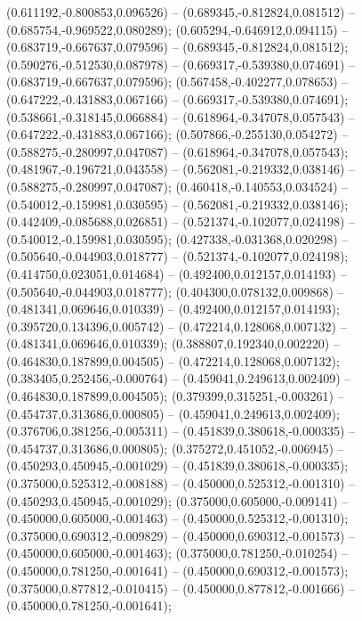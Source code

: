  (0.611192,-0.800853,0.096526) -- (0.689345,-0.812824,0.081512) -- (0.685754,-0.969522,0.080289);
 (0.605294,-0.646912,0.094115) -- (0.683719,-0.667637,0.079596) -- (0.689345,-0.812824,0.081512);
 (0.590276,-0.512530,0.087978) -- (0.669317,-0.539380,0.074691) -- (0.683719,-0.667637,0.079596);
 (0.567458,-0.402277,0.078653) -- (0.647222,-0.431883,0.067166) -- (0.669317,-0.539380,0.074691);
 (0.538661,-0.318145,0.066884) -- (0.618964,-0.347078,0.057543) -- (0.647222,-0.431883,0.067166);
 (0.507866,-0.255130,0.054272) -- (0.588275,-0.280997,0.047087) -- (0.618964,-0.347078,0.057543);
 (0.481967,-0.196721,0.043558) -- (0.562081,-0.219332,0.038146) -- (0.588275,-0.280997,0.047087);
 (0.460418,-0.140553,0.034524) -- (0.540012,-0.159981,0.030595) -- (0.562081,-0.219332,0.038146);
 (0.442409,-0.085688,0.026851) -- (0.521374,-0.102077,0.024198) -- (0.540012,-0.159981,0.030595);
 (0.427338,-0.031368,0.020298) -- (0.505640,-0.044903,0.018777) -- (0.521374,-0.102077,0.024198);
 (0.414750,0.023051,0.014684) -- (0.492400,0.012157,0.014193) -- (0.505640,-0.044903,0.018777);
 (0.404300,0.078132,0.009868) -- (0.481341,0.069646,0.010339) -- (0.492400,0.012157,0.014193);
 (0.395720,0.134396,0.005742) -- (0.472214,0.128068,0.007132) -- (0.481341,0.069646,0.010339);
 (0.388807,0.192340,0.002220) -- (0.464830,0.187899,0.004505) -- (0.472214,0.128068,0.007132);
 (0.383405,0.252456,-0.000764) -- (0.459041,0.249613,0.002409) -- (0.464830,0.187899,0.004505);
 (0.379399,0.315251,-0.003261) -- (0.454737,0.313686,0.000805) -- (0.459041,0.249613,0.002409);
 (0.376706,0.381256,-0.005311) -- (0.451839,0.380618,-0.000335) -- (0.454737,0.313686,0.000805);
 (0.375272,0.451052,-0.006945) -- (0.450293,0.450945,-0.001029) -- (0.451839,0.380618,-0.000335);
 (0.375000,0.525312,-0.008188) -- (0.450000,0.525312,-0.001310) -- (0.450293,0.450945,-0.001029);
 (0.375000,0.605000,-0.009141) -- (0.450000,0.605000,-0.001463) -- (0.450000,0.525312,-0.001310);
 (0.375000,0.690312,-0.009829) -- (0.450000,0.690312,-0.001573) -- (0.450000,0.605000,-0.001463);
 (0.375000,0.781250,-0.010254) -- (0.450000,0.781250,-0.001641) -- (0.450000,0.690312,-0.001573);
 (0.375000,0.877812,-0.010415) -- (0.450000,0.877812,-0.001666) -- (0.450000,0.781250,-0.001641);
